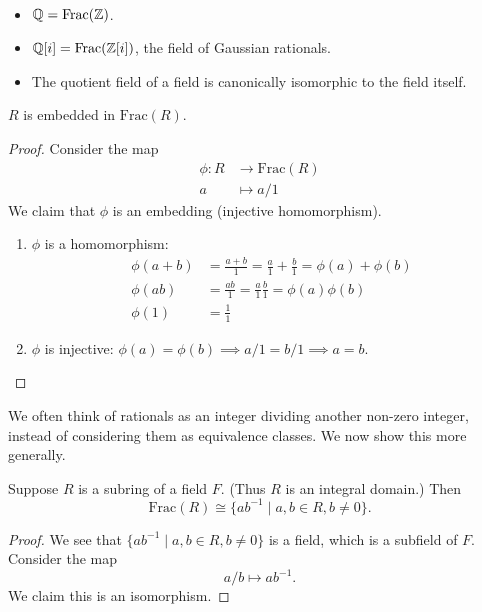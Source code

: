 \begin{example} \
\begin{itemize}
\item $\mathbb Q=\mathrm{Frac}(\mathbb Z)$.
\item $\mathbb Q[i]=\mathrm{Frac}(\mathbb Z[i])$, the field of Gaussian rationals.
\item The quotient field of a field is canonically isomorphic to the field itself.
\end{itemize}
\end{example}

\begin{lemma}
$R$ is embedded in $\mathrm{Frac}(R)$.
\end{lemma}

\begin{proof}
Consider the map
\begin{align*}
\phi\colon R&\to\mathrm{Frac}(R)\\
a&\mapsto a/1
\end{align*}
We claim that $\phi$ is an embedding (injective homomorphism).
\begin{enumerate}
\item $\phi$ is a homomorphism:
\begin{align*}
\phi(a+b)&=\frac{a+b}{1}=\frac{a}{1}+\frac{b}{1}=\phi(a)+\phi(b)\\
\phi(ab)&=\frac{ab}{1}=\frac{a}{1}\frac{b}{1}=\phi(a)\phi(b)\\
\phi(1)&=\frac{1}{1}
\end{align*}

\item $\phi$ is injective: $\phi(a)=\phi(b)\implies a/1=b/1\implies a=b$.
\end{enumerate}
\end{proof}

We often think of rationals as an integer dividing another non-zero integer, instead of considering them as equivalence classes.
We now show this more generally.

\begin{lemma}
Suppose $R$ is a subring of a field $F$. (Thus $R$ is an integral domain.) Then
\[\mathrm{Frac}(R)\cong\{ab^{-1}\mid a,b\in R, b\neq0\}.\]
\end{lemma}

\begin{proof}
We see that $\{ab^{-1}\mid a,b\in R, b\neq0\}$ is a field, which is a subfield of $F$.
Consider the map
\[a/b\mapsto ab^{-1}.\]
We claim this is an isomorphism.
\end{proof}

